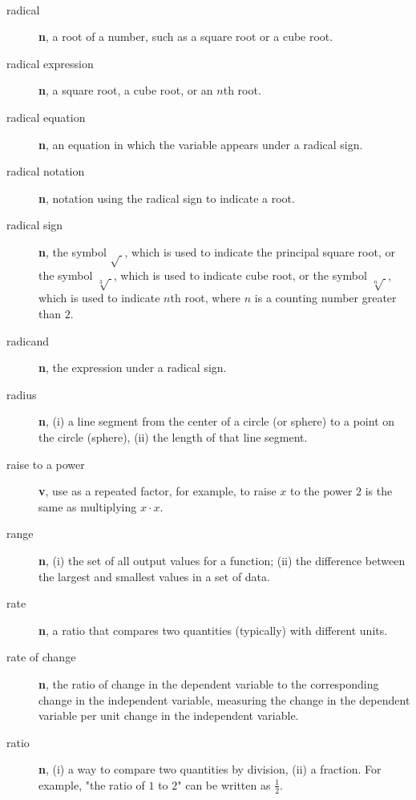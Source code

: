 \documentclass[10pt,]{book}
\newcommand{\terminology}[1]{\textbf{#1}}
\theoremstyle{plain}
\theoremstyle{definition}
\theoremstyle{definition}
\theoremstyle{definition}
\numberwithin{equation}{part}
\begin{document}
\paragraph[{}]{}\hypertarget{paragraphs-21}{}
\leavevmode%
\begin{description}
\item[{radical}]\hypertarget{li-751}{}\terminology{n}, a root of a number, such as a square root or a cube root.%
\item[{radical expression}]\hypertarget{li-752}{}\terminology{n}, a square root, a cube root, or an \(n\)th root.%
\item[{radical equation}]\hypertarget{li-753}{}\terminology{n}, an equation in which the variable appears under a radical sign.%
\item[{radical notation}]\hypertarget{li-754}{}\terminology{n}, notation using the radical sign to indicate a root.%
\item[{radical sign}]\hypertarget{li-755}{}\terminology{n}, the symbol \(\sqrt{~}\), which is used to indicate the principal square root, or the symbol \(\sqrt[3]{~}\), which is used to indicate cube root, or the symbol \(\sqrt[n]{~}\), which is used to indicate \(n\)th root, where \(n\) is a counting number greater than \(2\).%
\item[{radicand}]\hypertarget{li-756}{}\terminology{n}, the expression under a radical sign.%
\item[{radius}]\hypertarget{li-757}{}\terminology{n}, (i) a line segment from the center of a circle (or sphere) to a point on the circle (sphere), (ii) the length of that line segment.%
\item[{raise to a power}]\hypertarget{li-758}{}\terminology{v}, use as a repeated factor, for example, to raise \(x\) to the power \(2\) is the same as multiplying \(x\cdot x\).%
\item[{range}]\hypertarget{li-759}{}\terminology{n}, (i) the set of all output values for a function; (ii) the difference between the largest and smallest values in a set of data.%
\item[{rate}]\hypertarget{li-760}{}\terminology{n}, a ratio that compares two quantities (typically) with different units.%
\item[{rate of change}]\hypertarget{li-761}{}\terminology{n}, the ratio of change in the dependent variable to the corresponding change in the independent variable, measuring the change in the dependent variable per unit change in the independent variable.%
\item[{ratio}]\hypertarget{li-762}{}\terminology{n}, (i) a way to compare two quantities by division, (ii) a fraction. For example, "the ratio of \(1\) to \(2\)" can be written as \(\frac{1}{2} \).%

\end{description}
\end{document}
